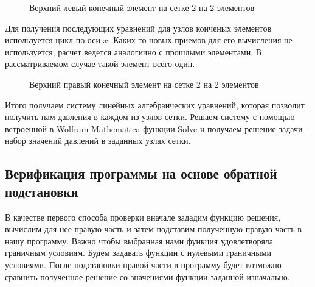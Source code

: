 \documentclass[a4paper,14pt]{extarticle}
\begin{document}
\begin{figure}[!htbp]
	\caption{Верхний левый конечный элемент на сетке 2 на 2 элементов}
	\label{left-top-el}
\end{figure}
\newpage
Для получения последующих уравнений для узлов конченых элементов используется цикл по оси $x$. Каких-то новых приемов для его вычисления не используется, расчет ведется аналогично с прошлыми элементами. В рассматриваемом случае такой элемент всего один.
\begin{figure}[!htbp]
	\caption{Верхний правый конечный элемент на сетке 2 на 2 элементов}
	\label{right-top-el}
\end{figure}

Итого получаем систему линейных алгебраических уравнений, которая позволит получить нам давления в каждом из узлов сетки. Решаем систему с помощью встроенной в Wolfram Mathematica функции Solve и получаем решение задачи -- набор значений давлений в заданных узлах сетки.

\subsection{Верификация программы на основе обратной подстановки}
В качестве первого способа проверки вначале зададим функцию решения, вычислим для нее правую часть и затем подставим полученную правую часть в нашу программу. Важно чтобы выбранная нами функция удовлетворяла граничным условиям. Будем задавать функции с нулевыми граничными условиями. После подстановки правой части в программу будет возможно сравнить полученное решение со значениями функции заданной изначально.
\end{document}
